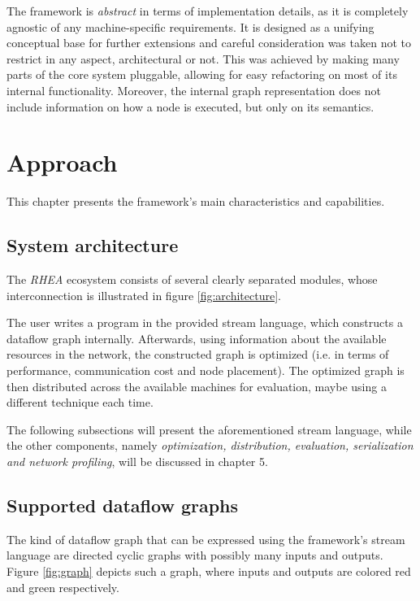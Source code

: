 \documentclass[sigplan,review,anonymous]{acmart}\settopmatter{printfolios=true}
\begin{document}
The framework is \textit{abstract} in terms of implementation details, as it is completely agnostic of any machine-specific requirements. It is designed as a unifying conceptual base for further extensions and careful consideration was taken not to restrict in any aspect, architectural or not. This was achieved by making many parts of the core system pluggable, allowing for easy refactoring on most of its internal functionality. Moreover, the internal graph representation does not include information on how a node is executed, but only on its semantics.

\section{Approach}
This chapter presents the framework's main characteristics and capabilities.

\subsection{System architecture}
The \textit{RHEA} ecosystem consists of several clearly separated modules, whose interconnection is illustrated in figure \ref{fig:architecture}.


The user writes a program in the provided stream language, which constructs a dataflow graph internally. Afterwards, using information about the available resources in the network, the constructed graph is optimized (i.e. in terms of performance, communication cost and node placement). The optimized graph is then distributed across the available machines for evaluation, maybe using a different technique each time.

The following subsections will present the aforementioned stream language, while the other components, namely \textit{optimization, distribution, evaluation, serialization and network profiling}, will be discussed in chapter 5.

\subsection{Supported dataflow graphs}

The kind of dataflow graph that can be expressed using the framework's stream language are directed cyclic graphs with possibly many inputs and outputs. Figure \ref{fig:graph} depicts such a graph, where inputs and outputs are colored red and green respectively.
\end{document}
